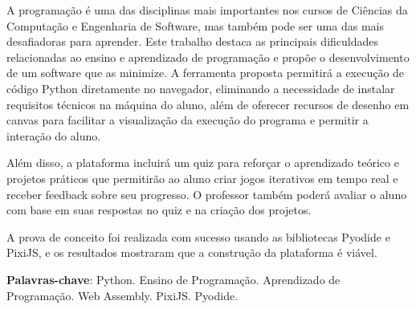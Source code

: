 \begin{resumo}
    A programação é uma das disciplinas mais importantes nos cursos de Ciências da Computação e Engenharia de Software, mas também pode ser uma das mais desafiadoras para aprender. Este trabalho destaca as principais dificuldades relacionadas ao ensino e aprendizado de programação e propõe o desenvolvimento de um software que as minimize. A ferramenta proposta permitirá a execução de código Python diretamente no navegador, eliminando a necessidade de instalar requisitos técnicos na máquina do aluno, além de oferecer recursos de desenho em canvas para facilitar a visualização da execução do programa e permitir a interação do aluno.

    Além disso, a plataforma incluirá um quiz para reforçar o aprendizado teórico e projetos práticos que permitirão ao aluno criar jogos iterativos em tempo real e receber feedback sobre seu progresso. O professor também poderá avaliar o aluno com base em suas respostas no quiz e na criação dos projetos.

    A prova de conceito foi realizada com sucesso usando as bibliotecas Pyodide e PixiJS, e os resultados mostraram que a construção da plataforma é viável.

 \vspace{\onelineskip}
    
 \noindent
 \textbf{Palavras-chave}:  Python. Ensino de Programação. Aprendizado de Programação. Web Assembly. PixiJS. Pyodide.
\end{resumo}
